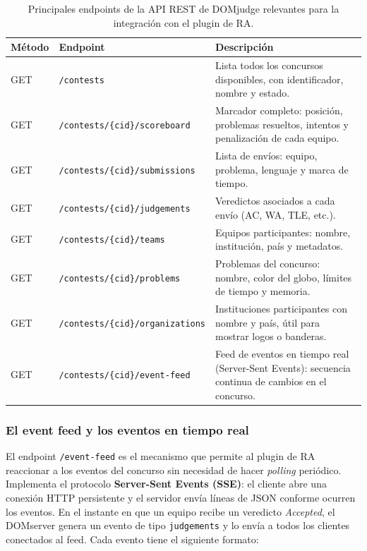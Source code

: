 \begin{table}[H]
\centering
\small
\begin{tabularx}{\textwidth}{l l X}
\toprule
\textbf{Método} & \textbf{Endpoint} & \textbf{Descripción} \\
\midrule
GET & \texttt{/contests} & Lista todos los concursos disponibles, con identificador, nombre y estado. \\[4pt]
GET & \texttt{/contests/\{cid\}/scoreboard} & Marcador completo: posición, problemas resueltos, intentos y penalización de cada equipo. \\[4pt]
GET & \texttt{/contests/\{cid\}/submissions} & Lista de envíos: equipo, problema, lenguaje y marca de tiempo. \\[4pt]
GET & \texttt{/contests/\{cid\}/judgements} & Veredictos asociados a cada envío (AC, WA, TLE, etc.). \\[4pt]
GET & \texttt{/contests/\{cid\}/teams} & Equipos participantes: nombre, institución, país y metadatos. \\[4pt]
GET & \texttt{/contests/\{cid\}/problems} & Problemas del concurso: nombre, color del globo, límites de tiempo y memoria. \\[4pt]
GET & \texttt{/contests/\{cid\}/organizations} & Instituciones participantes con nombre y país, útil para mostrar logos o banderas. \\[4pt]
GET & \texttt{/contests/\{cid\}/event-feed} & Feed de eventos en tiempo real (Server-Sent Events): secuencia continua de cambios en el concurso. \\
\bottomrule
\end{tabularx}
\caption{Principales endpoints de la API REST de DOMjudge relevantes para la integración con el plugin de RA.}
\label{tab:domjudge-endpoints}
\end{table}

\subsubsection*{El event feed y los eventos en tiempo real}

El endpoint \texttt{/event-feed} es el mecanismo que permite al plugin de RA reaccionar a los eventos del concurso sin necesidad de hacer \textit{polling} periódico. Implementa el protocolo \textbf{Server-Sent Events (SSE)}: el cliente abre una conexión HTTP persistente y el servidor envía líneas de JSON conforme ocurren los eventos. En el instante en que un equipo recibe un veredicto \textit{Accepted}, el DOMserver genera un evento de tipo \texttt{judgements} y lo envía a todos los clientes conectados al feed. Cada evento tiene el siguiente formato:

